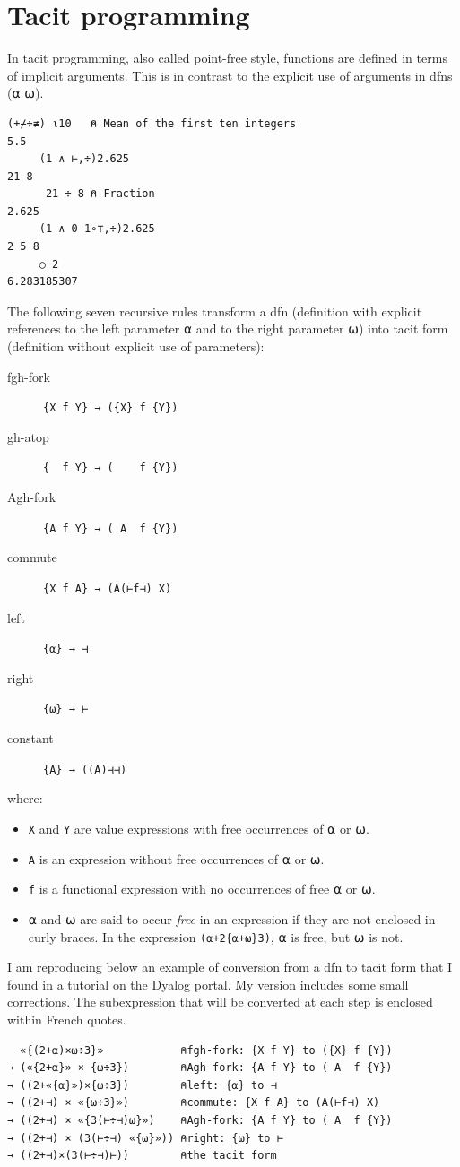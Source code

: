 \documentclass[a4paper,12pt]{book}
\begin{document}
\section{Tacit programming}
In tacit programming, also called
point-free style, functions are defined
in terms of implicit arguments. This is in
contrast to the explicit use of arguments
in dfns (⍺ ⍵).

\begin{lstlisting}[language=apl]
      (+⌿÷≢) ⍳10   ⍝ Mean of the first ten integers
5.5
     (1 ∧ ⊢,÷)2.625
21 8
      21 ÷ 8 ⍝ Fraction
2.625
     (1 ∧ 0 1∘⊤,÷)2.625
2 5 8
     ○ 2
6.283185307
\end{lstlisting}


The following seven recursive rules
transform a dfn (definition with explicit
references to the left parameter ⍺ and
to the right parameter ⍵) into tacit
form (definition without explicit use of parameters):

\begin{description}
\item[fgh-fork] \verb|{X f Y} → ({X} f {Y})|
\item[gh-atop] \verb|{  f Y} → (    f {Y})|
\item[Agh-fork] \verb|{A f Y} → ( A  f {Y})|
\item[commute] \verb|{X f A} → (A(⊢f⊣) X)|
\item[left] \verb|{⍺} → ⊣|
\item[right] \verb|{⍵} → ⊢|
\item[constant] \verb|{A} → ((A)⊣⊣)|
\end{description}
where:
\begin{itemize}
  \item \verb|X| and \verb|Y| are value expressions
  with free occurrences of ⍺ or ⍵.

  \item \verb|A| is an expression
  without free occurrences of ⍺ or ⍵.

  \item \verb|f| is a functional expression
  with no occurrences of free ⍺ or ⍵.

  \item ⍺ and ⍵ are said to occur \emph{free}
  in an expression if they are not enclosed
  in curly braces. In the expression
  \verb|(⍺+2{⍺+⍵}3)|, ⍺ is free, but ⍵ is not.
\end{itemize}

I am reproducing below an example of conversion
from a dfn to tacit form that I found in a tutorial
on the Dyalog portal. My version includes some
small corrections. The subexpression that will
be converted at each step is enclosed within French quotes.
\begin{verbatim}
  «{(2+⍺)×⍵÷3}»            ⍝fgh-fork: {X f Y} to ({X} f {Y})
→ («{2+⍺}» × {⍵÷3})        ⍝Agh-fork: {A f Y} to ( A  f {Y})
→ ((2+«{⍺}»)×{⍵÷3})        ⍝left: {⍺} to ⊣
→ ((2+⊣) × «{⍵÷3}»)        ⍝commute: {X f A} to (A(⊢f⊣) X)
→ ((2+⊣) × «{3(⊢÷⊣)⍵}»)    ⍝Agh-fork: {A f Y} to ( A  f {Y})
→ ((2+⊣) × (3(⊢÷⊣) «{⍵}»)) ⍝right: {⍵} to ⊢
→ ((2+⊣)×(3(⊢÷⊣)⊢))        ⍝the tacit form
\end{verbatim}
\label{dfn-to-tacit}
\end{document}
